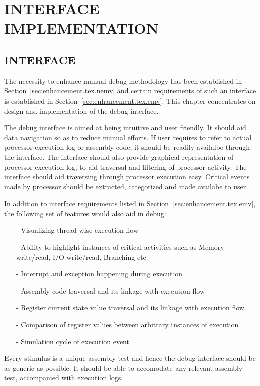 \chapter{INTERFACE IMPLEMENTATION}
\label{chap:GUI_impl.tex}
\section{INTERFACE}
The necessity to enhance manual debug methodology has been established in Section~\ref{sec:enhancement.tex.nemv} and certain requirements of such an interface is established in Section~\ref{sec:enhancement.tex.emv}. This chapter concentrates on design and implementation of the debug interface.

The debug interface is aimed at being intuitive and user friendly. It should aid data navigation so as to reduce manual efforts. If user requires to refer to actual processor execution log or assembly code, it should be readily availalbe through the interface. The interface should also provide graphical representation of processor execution log, to aid traversal and filtering of processor activity. The interface should aid traversing through processor execution easy.  Critical events made by processor should be extracted, categorized and made availabe to user.

In addition to interface requirements listed in Section~\ref{sec:enhancement.tex.emv}, the following set of features would also aid in debug:

\begin{itemize}
\item[-] Visualizing thread-wise execution flow
\item[-] Ability to highlight instances of critical activities such as Memory write/read, I/O write/read, Branching etc
\item[-] Interrupt and exception happening during execution
\item[-] Assembly code traversal and its linkage with execution flow
\item[-] Register current state value traversal and its linkage with execution flow
\item[-] Comparison of register values between arbitrary instances of execution
\item[-] Simulation cycle of execution event
\end{itemize}

Every stimulus is a unique assembly test and hence the debug interface should be as generic as possible. It should be able to accomodate any relevant assembly test, accompanied with execution logs.


